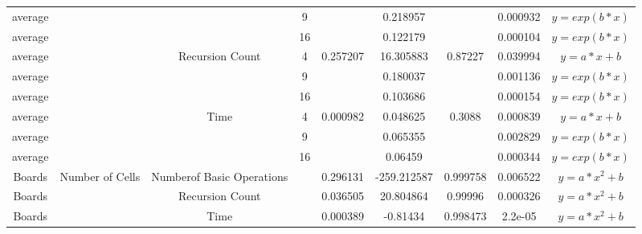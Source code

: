 \begin{tabular}{ |c|c|c|c|c|c|c|c|c| }
average &  &  & 9 &  & 0.218957 &  & 0.000932 & $ y = exp(b * x)$ \\
average &  &  & 16 &  & 0.122179 &  & 0.000104 & $ y = exp(b * x)$ \\
\hline
average &  & Recursion Count & 4 & 0.257207 & 16.305883 & 0.87227 & 0.039994 & $ y = a * x + b$ \\
average &  &  & 9 &  & 0.180037 &  & 0.001136 & $ y = exp(b * x)$ \\
average &  &  & 16 &  & 0.103686 &  & 0.000154 & $ y = exp(b * x)$ \\
\hline
average &  & Time & 4 & 0.000982 & 0.048625 & 0.3088 & 0.000839 & $ y = a * x + b$ \\
average &  &  & 9 &  & 0.065355 &  & 0.002829 & $ y = exp(b * x)$ \\
average &  &  & 16 &  & 0.06459 &  & 0.000344 & $ y = exp(b * x)$ \\
\hline
Boards & Number of Cells & Numberof Basic Operations &  & 0.296131 & -259.212587 & 0.999758 & 0.006522 & $ y = a * x^2 + b$ \\
Boards &  & Recursion Count &  & 0.036505 & 20.804864 & 0.99996 & 0.000326 & $ y = a * x^2 + b$ \\
Boards &  & Time &  & 0.000389 & -0.81434 & 0.998473 & 2.2e-05 & $ y = a * x^2 + b$ \\
\end{tabular}
